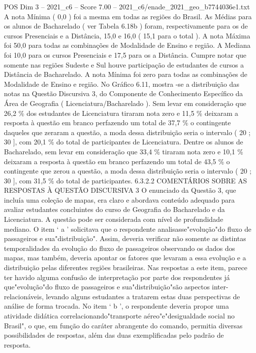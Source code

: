 \begin{textsample}{POS Dim 3 – 2021\_c6 – Score 7.00 – 2021\_c6/enade\_2021\_geo\_b7744036e1.txt}
A nota Mínima ( 0,0 ) foi a mesma em todas as regiões do Brasil.
As Médias para os alunos de Bacharelado ( ver Tabela 6.18b ) foram, respectivamente para os de cursos Presenciais e a Distância, 15,0 e 16,0 ( 15,1 para o total ).
A nota Máxima foi 50,0 para todas as combinações de Modalidade de Ensino e região.
A Mediana foi 10,0 para os cursos Presenciais e 17,5 para os a Distância.
Cumpre notar que somente nas regiões Sudeste e Sul houve participação de estudantes de cursos a Distância de Bacharelado.
A nota Mínima foi zero para todas as combinações de Modalidade de Ensino e região.
No Gráfico 6.11, mostra -se a distribuição das notas na Questão Discursiva 3, do Componente de Conhecimento Específico da Área de Geografia ( Licenciatura/Bacharelado ).
Sem levar em consideração que 26,2 \% dos estudantes de Licenciatura tiraram nota zero e 11,5 \% deixaram a resposta à questão em branco perfazendo um total de 37,7 \% o contingente daqueles que zeraram a questão, a moda dessa distribuição seria o intervalo ( 20 ; 30 ], com 20,1 \% do total de participantes de Licenciatura.
Dentre os alunos de Bacharelado, sem levar em consideração que 33,4 \% tiraram nota zero e 10,1 \% deixaram a resposta à questão em branco perfazendo um total de 43,5 \% o contingente que zerou a questão, a moda dessa distribuição seria o intervalo ( 20 ; 30 ], com 31,5 \% do total de participantes. 6.3.2.2 COMENTÁRIOS SOBRE AS RESPOSTAS À QUESTÃO DISCURSIVA 3 O enunciado da Questão 3, que incluía uma coleção de mapas, era claro e abordava conteúdo adequado para avaliar estudantes concluintes do curso de Geografia do Bacharelado e da Licenciatura.
A questão pode ser considerada com nível de profundidade mediano.
O item ‘ a ’ solicitava que o respondente analisasse"evolução"do fluxo de passageiros e sua"distribuição".
Assim, deveria verificar não somente as distintas temporalidades da evolução do fluxo de passageiros observando os dados dos mapas, mas também, deveria apontar os fatores que levaram a essa evolução e a distribuição pelas diferentes regiões brasileiras.
Nas respostas a este item, parece ter havido alguma confusão de interpretação por parte dos respondentes já que"evolução"do fluxo de passageiros e sua"distribuição"são aspectos inter-relacionáveis, levando alguns estudantes a tratarem estas duas perspectivas de análise de forma trocada.
No item ‘ b ’, o respondente deveria propor uma atividade didática correlacionando"transporte aéreo"e"desigualdade social no Brasil", o que, em função do caráter abrangente do comando, permitia diversas possibilidades de respostas, além das duas exemplificadas pelo padrão de resposta.

\end{textsample}
